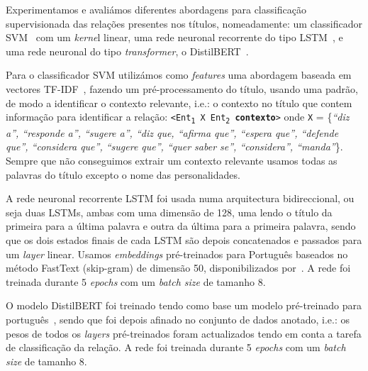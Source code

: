 \documentclass[a4paper, twocolumn, 11pt, twoside]{article}
\begin{document}
Experimentamos e avaliámos diferentes abordagens para classificação supervisionada das relações presentes nos títulos, nomeadamente: um classificador SVM~\citep{cortes1995support} com um \textit{kerne}l linear, uma rede neuronal recorrente do tipo LSTM~\citep{10.1162/neco.1997.9.8.1735}, e uma rede neuronal do tipo \textit{transformer}, o DistilBERT~\citep{9463516}.

Para o classificador SVM utilizámos como \textit{features} uma abordagem baseada em vectores TF-IDF~\citep{DBLP:journals/ipm/SaltonB88}, fazendo um pré-processamento do título, usando uma padrão, de modo a identificar o contexto relevante, i.e.: o contexto no título que contem informação para identificar a relação: \texttt{<Ent\textsubscript{1} X Ent\textsubscript{2} \textbf{contexto}>} onde \texttt{X} = \{\textit{“diz a”, “responde a”, “sugere a”, “diz que, “afirma que”, “espera que”, “defende que”, “considera que”, “sugere que”, “quer saber se”, “considera”, “manda”}\}. Sempre que não conseguimos extrair um contexto relevante usamos todas as palavras do título excepto o nome das personalidades.

A rede neuronal recorrente LSTM foi usada numa arquitectura bidireccional, ou seja duas LSTMs, ambas com uma dimensão de 128, uma lendo o título da primeira para a última palavra e outra da última para a primeira palavra, sendo que os dois estados finais de cada LSTM são depois concatenados e passados para um \textit{layer} linear. Usamos \textit{embeddings} pré-treinados para Português baseados no método FastText (skip-gram) de dimensão 50, disponibilizados por~\cite{hartmann-etal-2017-portuguese}. A rede foi treinada durante 5 \textit{epochs} com um \textit{batch size} de tamanho 8.

O modelo DistilBERT foi treinado tendo como base um modelo pré-treinado para português~\citep{abdaoui-etal-2020-load}, sendo que foi depois afinado no conjunto de dados anotado, i.e.: os pesos de todos os \textit{layers} pré-treinados foram actualizados tendo em conta a tarefa de classificação da relação. A rede foi treinada durante 5 \textit{epochs} com um \textit{batch size} de tamanho 8.
\end{document}
